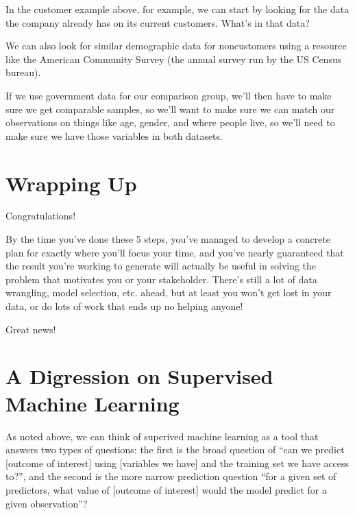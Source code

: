 \documentclass[letterpaper,10pt,english]{jupyterBook}
\begin{document}
\sphinxAtStartPar
In the customer example above, for example, we can start by looking for the data the company already has on its current customers. What’s in that data?

\sphinxAtStartPar
We can also look for similar demographic data for non\sphinxhyphen{}customers using a resource like the American Community Survey (the annual survey run by the US Census bureau).

\sphinxAtStartPar
If we use government data for our comparison group, we’ll then have to make sure we get comparable samples, so we’ll want to make sure we can match our observations on things like age, gender, and where people live, so we’ll need to make sure we have those variables in both datasets.


\section{Wrapping Up}
\label{\detokenize{40_in_practice/05_backwards_design:wrapping-up}}
\sphinxAtStartPar
Congratulations!

\sphinxAtStartPar
By the time you’ve done these 5 steps, you’ve managed to develop a concrete plan for exactly where you’ll focus your time, and you’ve nearly guaranteed that the result you’re working to generate will actually be useful in solving the problem that motivates you or your stakeholder. There’s still a lot of data wrangling, model selection, etc. ahead, but at least you won’t get lost in your data, or do lots of work that ends up no helping anyone!

\sphinxAtStartPar
{} Great news! 


\section{A Digression on Supervised Machine Learning}
\label{\detokenize{40_in_practice/05_backwards_design:a-digression-on-supervised-machine-learning}}
\sphinxAtStartPar
As noted above, we can think of superived machine learning as a tool that answers two types of questions: the first is the broad question of “can we predict {[}outcome of interest{]} using {[}variables we have{]} and the training set we have access to?”, and the second is the more narrow prediction question “for a given set of predictors, what value of {[}outcome of interest{]} would the model predict for a given observation”?
\end{document}
